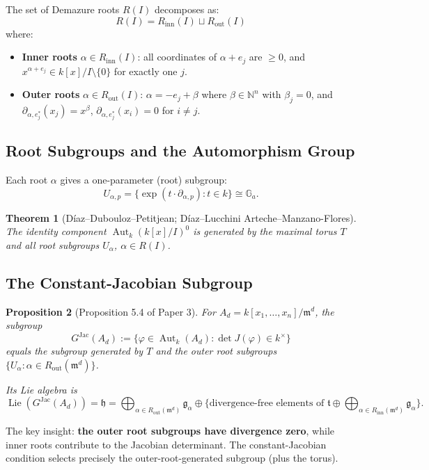 \documentclass[12pt,a4paper]{article}
\newtheorem{theorem}{Theorem}[section]
\newtheorem{proposition}[theorem]{Proposition}
\theoremstyle{definition}
\newcommand{\NN}{\mathbb{N}}
\newcommand{\kk}{k}
\newcommand{\pp}{\mathfrak{m}}
\newcommand{\Aut}{\operatorname{Aut}}
\newcommand{\Lie}{\operatorname{Lie}}
\newcommand{\GJac}{G^{\mathrm{Jac}}}
\newcommand{\Ga}{\mathbb{G}_a}
\begin{document}
The set of Demazure roots $R(I)$ decomposes as:
\[
  R(I) = R_{\mathrm{inn}}(I) \sqcup R_{\mathrm{out}}(I)
\]
where:
\begin{itemize}
\item \textbf{Inner roots} $\alpha \in R_{\mathrm{inn}}(I)$: all coordinates of $\alpha + e_j$
  are $\geq 0$, and $x^{\alpha+e_j} \in \kk[x]/I \setminus \{0\}$ for exactly one $j$.
\item \textbf{Outer roots} $\alpha \in R_{\mathrm{out}}(I)$: $\alpha = -e_j + \beta$ where
  $\beta \in \NN^n$ with $\beta_j = 0$, and $\partial_{\alpha,e_j^*}(x_j) = x^\beta$,
  $\partial_{\alpha,e_j^*}(x_i) = 0$ for $i \neq j$.
\end{itemize}

\subsection{Root Subgroups and the Automorphism Group}

Each root $\alpha$ gives a one-parameter (root) subgroup:
\[
  U_{\alpha,p} = \{\exp(t \cdot \partial_{\alpha,p}) : t \in \kk\} \cong \Ga.
\]

\begin{theorem}[D\'iaz--Dubouloz--Petitjean; D\'iaz--Lucchini Arteche--Manzano-Flores]
The identity component $\Aut_\kk(\kk[x]/I)^0$ is generated by the maximal torus $T$ and
all root subgroups $U_\alpha$, $\alpha \in R(I)$.
\end{theorem}

\subsection{The Constant-Jacobian Subgroup}\label{sec:GJac}

\begin{proposition}[Proposition 5.4 of Paper 3]
For $A_d = \kk[x_1,\ldots,x_n]/\pp^d$, the subgroup
\[
  \GJac(A_d) := \{\varphi \in \Aut_\kk(A_d) : \det J(\varphi) \in \kk^\times\}
\]
equals the subgroup generated by $T$ and the outer root subgroups $\{U_\alpha : \alpha \in
R_{\mathrm{out}}(\pp^d)\}$.

Its Lie algebra is
\[
  \Lie(\GJac(A_d)) = \mathfrak{h} = \bigoplus_{\alpha \in R_{\mathrm{out}}(\pp^d)}
    \mathfrak{g}_\alpha \oplus \{\text{divergence-free elements of } \mathfrak{t}
    \oplus \bigoplus_{\alpha \in R_{\mathrm{inn}}(\pp^d)} \mathfrak{g}_\alpha\}.
\]
\end{proposition}

The key insight: \textbf{the outer root subgroups have divergence zero}, while inner roots
contribute to the Jacobian determinant. The constant-Jacobian condition selects precisely the
outer-root-generated subgroup (plus the torus).
\end{document}
